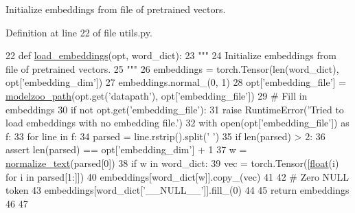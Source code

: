\begin{DoxyVerb}Initialize embeddings from file of pretrained vectors.
\end{DoxyVerb}
 

Definition at line 22 of file utils.\+py.


\begin{DoxyCode}
22 \textcolor{keyword}{def }\hyperlink{namespaceparlai_1_1agents_1_1drqa_1_1utils_aa92d9906125210574825a20c75c199c8}{load\_embeddings}(opt, word\_dict):
23     \textcolor{stringliteral}{"""}
24 \textcolor{stringliteral}{    Initialize embeddings from file of pretrained vectors.}
25 \textcolor{stringliteral}{    """}
26     embeddings = torch.Tensor(len(word\_dict), opt[\textcolor{stringliteral}{'embedding\_dim'}])
27     embeddings.normal\_(0, 1)
28     opt[\textcolor{stringliteral}{'embedding\_file'}] = \hyperlink{namespaceparlai_1_1agents_1_1legacy__agents_1_1seq2seq_1_1utils__v0_a5fbd3301b67f00d6d146fb01c7cd7626}{modelzoo\_path}(opt.get(\textcolor{stringliteral}{'datapath'}), opt[\textcolor{stringliteral}{'embedding\_file'}])
29     \textcolor{comment}{# Fill in embeddings}
30     \textcolor{keywordflow}{if} \textcolor{keywordflow}{not} opt.get(\textcolor{stringliteral}{'embedding\_file'}):
31         \textcolor{keywordflow}{raise} RuntimeError(\textcolor{stringliteral}{'Tried to load embeddings with no embedding file.'})
32     with open(opt[\textcolor{stringliteral}{'embedding\_file'}]) \textcolor{keyword}{as} f:
33         \textcolor{keywordflow}{for} line \textcolor{keywordflow}{in} f:
34             parsed = line.rstrip().split(\textcolor{stringliteral}{' '})
35             \textcolor{keywordflow}{if} len(parsed) > 2:
36                 \textcolor{keyword}{assert} len(parsed) == opt[\textcolor{stringliteral}{'embedding\_dim'}] + 1
37                 w = \hyperlink{namespaceparlai_1_1agents_1_1drqa_1_1utils_a125ab4e64306060e9ecaa3999f7be6b6}{normalize\_text}(parsed[0])
38                 \textcolor{keywordflow}{if} w \textcolor{keywordflow}{in} word\_dict:
39                     vec = torch.Tensor([\hyperlink{namespaceprojects_1_1controllable__dialogue_1_1make__control__dataset_aa2b7207688c641dbc094ab44eca27113}{float}(i) \textcolor{keywordflow}{for} i \textcolor{keywordflow}{in} parsed[1:]])
40                     embeddings[word\_dict[w]].copy\_(vec)
41 
42     \textcolor{comment}{# Zero NULL token}
43     embeddings[word\_dict[\textcolor{stringliteral}{'\_\_NULL\_\_'}]].fill\_(0)
44 
45     \textcolor{keywordflow}{return} embeddings
46 
47 
\end{DoxyCode}
\mbox{\label{namespaceparlai_1_1agents_1_1drqa_1_1utils_a125ab4e64306060e9ecaa3999f7be6b6}} 
